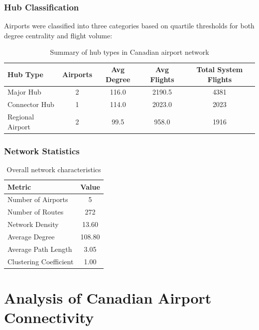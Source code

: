 \documentclass[9pt]{article}
\begin{document}
\subsubsection{Hub Classification}

Airports were classified into three categories based on quartile thresholds for both degree centrality and flight volume:

\begin{table}[h!]
    \centering
    \caption{Summary of hub types in Canadian airport network}
    \begin{tabular}{lcccc}
        \toprule
        Hub Type & Airports & Avg Degree & Avg Flights & Total System Flights \\
        \midrule
        Major Hub        & 2 & 116.0 & 2190.5 & 4381 \\
        Connector Hub    & 1 & 114.0 & 2023.0 & 2023 \\
        Regional Airport & 2 & 99.5  & 958.0  & 1916 \\
        \bottomrule
    \end{tabular}
\end{table}

\subsubsection{Network Statistics}

\begin{table}[h!]
    \centering
    \caption{Overall network characteristics}
    \begin{tabular}{lc}
        \toprule
        Metric & Value \\
        \midrule
        Number of Airports       & 5 \\
        Number of Routes         & 272 \\
        Network Density          & 13.60 \\
        Average Degree           & 108.80 \\
        Average Path Length      & 3.05 \\
        Clustering Coefficient   & 1.00 \\
        \bottomrule
    \end{tabular}
\end{table}

\section{Analysis of Canadian Airport Connectivity}
\end{document}
